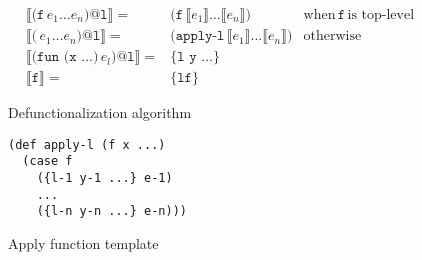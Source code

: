 \begin{figure}
    \centering
   \begin{align*}
        \llbracket \texttt{(f}\,e_1\ldots e_n\texttt{)@l} \rrbracket
        =& \texttt{(f}\,\llbracket e_1 \rrbracket \ldots \llbracket e_n \rrbracket \texttt{)}
         & \text{when}\,\texttt{f}\,\text{is top-level}\\
%
        \llbracket \texttt{(}\,e_1\ldots e_n\texttt{)@l} \rrbracket
        =& \texttt{(apply-l}\,\llbracket e_1 \rrbracket \ldots \llbracket e_n \rrbracket \texttt{)}
         & \text{otherwise}\\
%
        \llbracket \texttt{(fun (x ...)}\,e_l\texttt{)@l} \rrbracket
        =& \texttt{\{l y ...\}} & \\
%
        \llbracket \texttt{f} \rrbracket
        =& \texttt{\{lf\}} %
   \end{align*}
    \caption{Defunctionalization algorithm}
    \label{fig:den-interp}
    \begin{verbatim}
(def apply-l (f x ...)
  (case f
    ({l-1 y-1 ...} e-1)
    ...
    ({l-n y-n ...} e-n)))
   \end{verbatim}
   \caption{Apply function template}
    \label{fig:den-template}
\end{figure}

